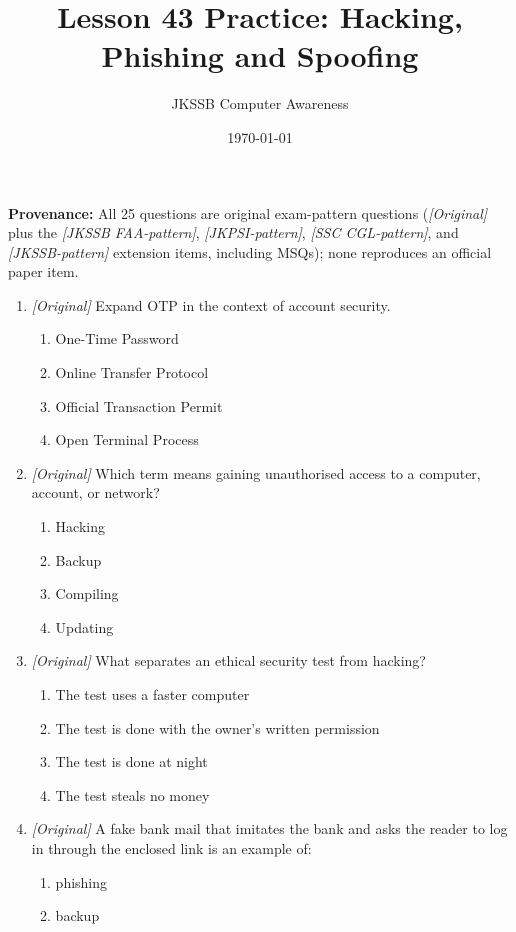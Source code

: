 \documentclass[11pt]{article}
\title{Lesson 43 Practice: Hacking, Phishing and Spoofing}
\author{JKSSB Computer Awareness}
\date{\today}
\begin{document}
\maketitle
\noindent\textbf{Provenance:} All 25 questions are original exam-pattern questions (\textit{[Original]} plus the \textit{[JKSSB FAA-pattern]}, \textit{[JKPSI-pattern]}, \textit{[SSC CGL-pattern]}, and \textit{[JKSSB-pattern]} extension items, including MSQs); none reproduces an official paper item.

\begin{enumerate}[label=\textbf{Q\arabic*.}, leftmargin=*]
\item \textit{[Original]} Expand OTP in the context of account security.
  \begin{enumerate}[label=\Alph*.]
    \item One-Time Password
    \item Online Transfer Protocol
    \item Official Transaction Permit
    \item Open Terminal Process
  \end{enumerate}
\item \textit{[Original]} Which term means gaining unauthorised access to
  a computer, account, or network?
  \begin{enumerate}[label=\Alph*.]
    \item Hacking
    \item Backup
    \item Compiling
    \item Updating
  \end{enumerate}
\item \textit{[Original]} What separates an ethical security test from
  hacking?
  \begin{enumerate}[label=\Alph*.]
    \item The test uses a faster computer
    \item The test is done with the owner's written permission
    \item The test is done at night
    \item The test steals no money
  \end{enumerate}
\item \textit{[Original]} A fake bank mail that imitates the bank and asks
  the reader to log in through the enclosed link is an example of:
  \begin{enumerate}[label=\Alph*.]
    \item phishing
    \item backup

\end{enumerate}
\end{enumerate}
\end{document}
